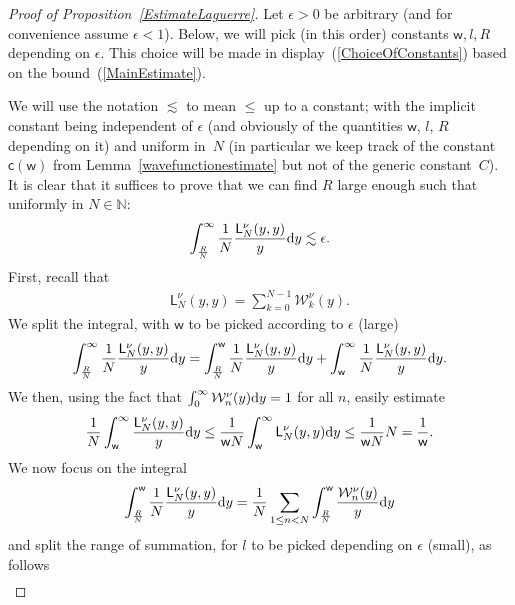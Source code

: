 \begin{proof}[Proof of Proposition~\ref{EstimateLaguerre}]
Let $\epsilon>0$ be arbitrary (and for convenience assume $\epsilon<1$). Below, we will pick (in this order) constants $\mathsf{w}, l, R$ depending on $\epsilon$. This choice will be made in display~(\ref{ChoiceOfConstants}) based on the bound~(\ref{MainEstimate}).

We will use the notation $\lesssim$ to mean $\le$ up to a constant; with the implicit constant being independent of $\epsilon$ (and obviously of the quantities $\mathsf{w}$, $l$, $R$ depending on it) and uniform in~$N$ (in particular we keep track of the constant $\mathsf{c}(\mathsf{w})$ from Lemma~\ref{wavefunctionestimate} but not of the generic constant~$C$). It is clear that it suffices to prove that we can find $R$ large enough such that uniformly in $N \in \mathbb{N}$:
\begin{gather*}
\int_{\frac{R}{N}}^{\infty}\frac{1}{N}\frac{\mathsf{L}_N^{\nu}(y,y)}{y}{\rm d}y \lesssim \epsilon.
\end{gather*}
First, recall that
\begin{gather*}
\mathsf{L}_N^{\nu}(y,y)=\sum_{k=0}^{N-1}\mathcal{W}_k^\nu(y).
\end{gather*}
We split the integral, with $\mathsf{w}$ to be picked according to $\epsilon$ (large)
\begin{gather*}
\int_{\frac{R}{N}}^{\infty}\frac{1}{N}\frac{\mathsf{L}_N^{\nu}(y,y)}{y}{\rm d} y= \int_{\frac{R}{N}}^{\mathsf{w}}\frac{1}{N}\frac{\mathsf{L}_N^{\nu}(y,y)}{y}{\rm d}y +\int_{\mathsf{w}}^{\infty}\frac{1}{N}\frac{\mathsf{L}_N^{\nu}(y,y)}{y}{\rm d}y.
\end{gather*}
We then, using the fact that $\int_{0}^{\infty}\mathcal{W}_n^{\nu}(y){\rm d}y=1$ for all $n$, easily estimate
\begin{gather*}
\frac{1}{N}\int_{\mathsf{w}}^{\infty}\frac{\mathsf{L}_N^{\nu}(y,y)}{y}{\rm d}y\le\frac{1}{\mathsf{w}N} \int_{\mathsf{w}}^{\infty}\mathsf{L}_N^{\nu}(y,y){\rm d}y \le \frac{1}{\mathsf{w}N}N=\frac{1}{\mathsf{w}}.
\end{gather*}
We now focus on the integral
\begin{gather*}
\int_{\frac{R}{N}}^{\mathsf{w}}\frac{1}{N}\frac{\mathsf{L}_N^{\nu}(y,y)}{y}{\rm d}y =\frac{1}{N}\sum_{1 \le n < N}^{} \int_{\frac{R}{N}}^{\mathsf{w}}\frac{\mathcal{W}_n^{\nu}(y)}{y}{\rm d}y
\end{gather*}
and split the range of summation, for $l$ to be picked depending on $\epsilon$ (small), as follows
\begin{gather*}

\end{gather*}
\end{proof}
